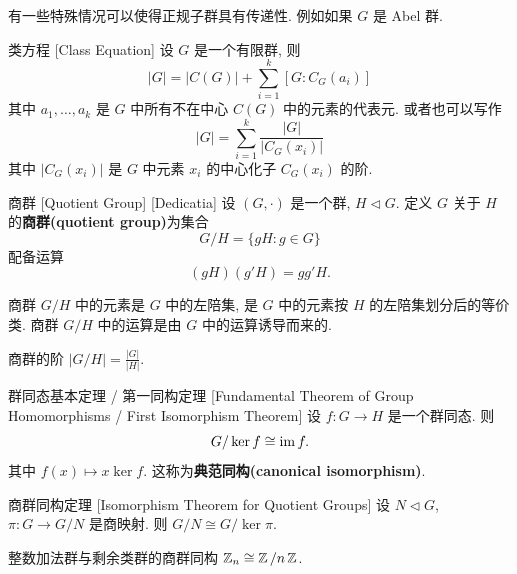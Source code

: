         \begin{rmk}
            有一些特殊情况可以使得正规子群具有传递性. 例如如果 \(G\) 是 Abel 群.
        \end{rmk}

        \begin{thm}
            {类方程}
            [Class Equation]
            设 \(G\) 是一个有限群, 则
            \[|G|=|C(G)|+\sum_{i=1}^k [G:C_G(a_i)]\]
            其中 \(a_1,\dots,a_k\) 是 \(G\) 中所有不在中心 \(C(G)\) 中的元素的代表元. 或者也可以写作
            \[|G|=\sum_{i=1}^k \frac{|G|}{|C_G(x_i)|}\]
            其中 \(|C_G(x_i)|\) 是 \(G\) 中元素 \(x_i\) 的中心化子 \(C_G(x_i)\) 的阶.
        \end{thm}

        \begin{dfn}
            {商群}
            [Quotient Group]
            [Dedicatia]
            设 \((G,\cdot)\) 是一个群, \(H\lhd G\). 定义 \(G\) 关于 \(H\) 的\textbf{商群(quotient group)}为集合
            \[G/H=\{gH: g\in G\}\]
            配备运算
            \[(gH)(g'H)=gg'H.\]
        \end{dfn}

        \begin{rmk}
            [Dedicatia]
            商群 \(G/H\) 中的元素是 \(G\) 中的左陪集, 是 \(G\) 中的元素按 \(H\) 的左陪集划分后的等价类. 商群 \(G/H\) 中的运算是由 \(G\) 中的运算诱导而来的.
        \end{rmk}

        \begin{ppt}
            {商群的阶}
            \(|G/H|=\frac{|G|}{|H|}\).
        \end{ppt}

        \begin{thm}
            [FirstIsom]
            {群同态基本定理 / 第一同构定理}
            [Fundamental Theorem of Group Homomorphisms / First Isomorphism Theorem]
            设 \(f:G\to H\) 是一个群同态. 则 
            \[G/\ker f \cong \operatorname{im} f.\]
            其中 \(f(x)\mapsto x\ker f\). 这称为\textbf{典范同构(canonical isomorphism)}.
        \end{thm}

        \begin{crl}
            {商群同构定理}
            [Isomorphism Theorem for Quotient Groups]
            设 \(N\lhd G\), \(\pi:G\to G/N\) 是商映射. 则 \(G/N\cong G/\ker \pi\).
        \end{crl}

        \begin{ins}
            {整数加法群与剩余类群的商群同构}
            \(\operatorname{\mathbb{Z}}_n \cong \operatorname{\mathbb{Z}}/n\operatorname{\mathbb{Z}}\).
        \end{ins}

